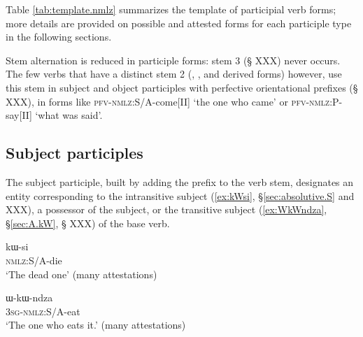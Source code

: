 Table \ref{tab:template.nmlz} summarizes the template of participial verb forms; more details are provided on possible and attested forms for each participle type in the following sections.

\begin{table}[h]
\caption{The template of participial verb forms in Japhug} \centering \label{tab:template.nmlz}
\end{table}

Stem alternation is reduced in participle forms: stem 3 (§ XXX) never occurs. The few verbs that have a distinct stem 2 (, ,  and derived forms) however, use this stem in subject and object participles with perfective orientational prefixes (§ XXX), in forms like  \textsc{pfv}-\textsc{nmlz}:S/A-come[II] `the one who came'
or  \textsc{pfv}-\textsc{nmlz}:P-say[II] `what was said'.
 
\subsection{Subject participles} \label{sec:subject.participles}
The subject participle, built by adding the prefix  to the verb stem, designates an entity corresponding to the intransitive subject (\ref{ex:kWsi}, §\ref{sec:absolutive.S} and XXX), a possessor of the subject, or the transitive subject (\ref{ex:WkWndza}, §\ref{sec:A.kW}, § XXX) of the base verb. 

 \begin{exe}
\ex \label{ex:kWsi}
\gll kɯ-si  \\
  \textsc{nmlz}:S/A-die \\
 \glt  `The dead one' (many attestations)
\end{exe}

 \begin{exe} 
\ex \label{ex:WkWndza}
\gll ɯ-kɯ-ndza \\
  \textsc{3sg}-\textsc{nmlz}:S/A-eat \\
 \glt  `The one who eats it.' (many attestations)
\end{exe}

